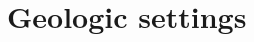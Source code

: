 \documentclass[draft]{agujournal2019}
\begin{document}



\section*{Geologic settings}
\end{document}
